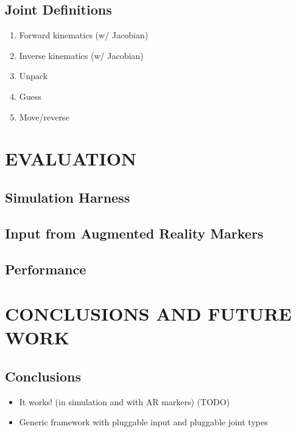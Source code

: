 \documentclass[letterpaper, 10 pt, conference]{ieeeconf}  %
\begin{document}
\subsection{Joint Definitions}
    \begin{enumerate}
      \item Forward kinematics (w/ Jacobian)
      \item Inverse kinematics (w/ Jacobian)
      \item Unpack
      \item Guess
      \item Move/reverse
    \end{enumerate}

\section{EVALUATION}

\subsection{Simulation Harness}
\subsection{Input from Augmented Reality Markers}
\subsection{Performance}

\section{CONCLUSIONS AND FUTURE WORK}

\subsection{Conclusions}
    \begin{itemize}
      \item It works! (in simulation and with AR markers) (TODO)
      \item Generic framework with pluggable input and pluggable joint types
    \end{itemize}
\end{document}
